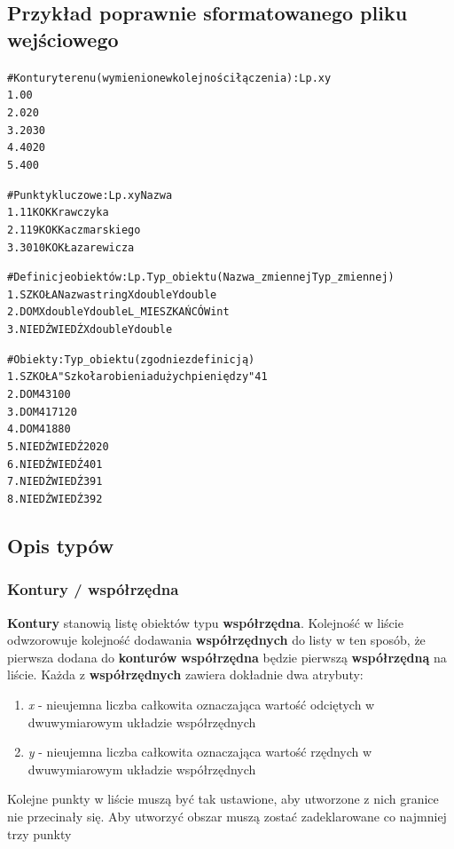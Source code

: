 \documentclass[a4paper, 10pt, titlepage]{article}
\begin{document}
\subsection{Przykład poprawnie sformatowanego pliku wejściowego}
\begin{alltt}
\rmfamily
\# Kontury terenu (wymienione w kolejności łączenia): Lp. x y
1. 0 0
2. 0 20
3. 20 30
4. 40 20
5. 40 0

\# Punkty kluczowe: Lp. x y Nazwa
1. 1 1 KOK Krawczyka
2. 1 19 KOK Kaczmarskiego
3. 30 10 KOK Łazarewicza

\# Definicje obiektów: Lp. Typ\_obiektu (Nazwa\_zmiennej Typ\_zmiennej)
1. SZKOŁA Nazwa string X double Y double
2. DOM X double Y double L\_MIESZKAŃCÓW int
3. NIEDŹWIEDŹ X double Y double

\# Obiekty: Typ\_obiektu (zgodnie z definicją)
1. SZKOŁA "Szkoła robienia dużych pieniędzy" 4 1
2. DOM 4 3 100
3. DOM 4 17 120
4. DOM 4 18 80
5. NIEDŹWIEDŹ 20 20
6. NIEDŹWIEDŹ 40 1
7. NIEDŹWIEDŹ 39 1
8. NIEDŹWIEDŹ 39 2
\end{alltt}

\subsection{Opis typów}

\subsubsection{Kontury / współrzędna}
\textbf{Kontury} stanowią listę obiektów typu \textbf{współrzędna}.
Kolejność w liście odwzorowuje kolejność dodawania \textbf{współrzędnych} do listy w ten sposób, że pierwsza dodana do \textbf{konturów} \textbf{współrzędna} będzie pierwszą \textbf{współrzędną} na liście.
Każda z \textbf{współrzędnych} zawiera dokładnie dwa atrybuty:
\begin{enumerate}
\item \textit{x} - nieujemna liczba całkowita oznaczająca wartość odciętych w dwuwymiarowym układzie współrzędnych
\item \textit{y} - nieujemna liczba całkowita oznaczająca wartość rzędnych w dwuwymiarowym układzie współrzędnych
\end{enumerate}
Kolejne punkty w liście muszą być tak ustawione, aby utworzone z nich granice nie przecinały się.
Aby utworzyć obszar muszą zostać zadeklarowane co najmniej trzy punkty
\end{document}
